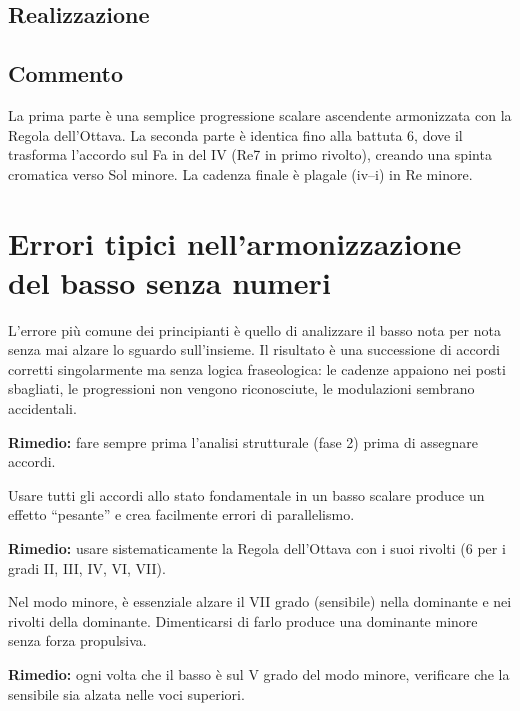 \subsection{Realizzazione}



\subsection{Commento}

La prima parte è una semplice progressione scalare ascendente armonizzata con la Regola dell'Ottava. La seconda parte è identica fino alla battuta 6, dove il \Fadiesis{} trasforma l'accordo sul Fa in  del IV (Re7 in primo rivolto), creando una spinta cromatica verso Sol minore. La cadenza finale è plagale (iv--i) in Re minore.

\section{Errori tipici nell'armonizzazione del basso senza numeri}
\label{sec:errori_tipici}

\begin{errore}
	\label{err:nota_per_nota}
	L'errore più comune dei principianti è quello di analizzare il basso nota per nota senza mai alzare lo sguardo sull'insieme. Il risultato è una successione di accordi corretti singolarmente ma senza logica fraseologica: le cadenze appaiono nei posti sbagliati, le progressioni non vengono riconosciute, le modulazioni sembrano accidentali.
	
	\textbf{Rimedio:} fare sempre prima l'analisi strutturale (fase 2) prima di assegnare accordi.
\end{errore}

\begin{errore}
	\label{err:troppi_fondamentali}
	Usare tutti gli accordi allo stato fondamentale in un basso scalare produce un effetto ``pesante'' e crea facilmente errori di parallelismo.
	
	\textbf{Rimedio:} usare sistematicamente la Regola dell'Ottava con i suoi rivolti (6 per i gradi II, III, IV, VI, VII).
\end{errore}

\begin{errore}
	\label{err:sensibile_minore}
	Nel modo minore, è essenziale alzare il VII grado (sensibile) nella dominante e nei rivolti della dominante. Dimenticarsi di farlo produce una dominante minore senza forza propulsiva.
	
	\textbf{Rimedio:} ogni volta che il basso è sul V grado del modo minore, verificare che la sensibile sia alzata nelle voci superiori.
\end{errore}

